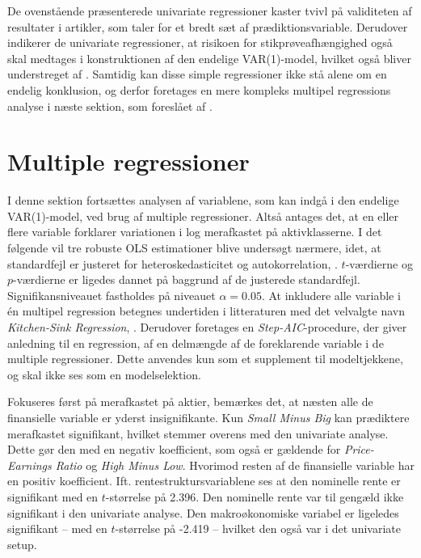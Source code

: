 \documentclass[
  a4paper,
  oneside]{memoir}
\begin{document}
De ovenstående præsenterede univariate regressioner kaster tvivl på validiteten af resultater i artikler, som taler for et bredt sæt af prædiktionsvariable. Derudover indikerer de univariate regressioner, at risikoen for stikprøveafhængighed også skal medtages i konstruktionen af den endelige VAR(1)-model, hvilket også bliver understreget af \citep{Goyal2007}. Samtidig kan disse simple regressioner ikke stå alene om en endelig konklusion, og derfor foretages en mere kompleks multipel regressions analyse i næste sektion, som foreslået af \citep{Goyal2007}.

\hypertarget{multreg}{%
\section{Multiple regressioner}\label{multreg}}

I denne sektion fortsættes analysen af variablene, som kan indgå i den endelige VAR(1)-model, ved brug af multiple regressioner. Altså antages det, at en eller flere variable forklarer variationen i log merafkastet på aktivklasserne. I det følgende vil tre robuste OLS estimationer blive undersøgt nærmere, idet, at standardfejl er justeret for heteroskedasticitet og autokorrelation, \citep{Newey1987}. \(t\)-værdierne og \(p\)-værdierne er ligedes dannet på baggrund af de justerede standardfejl. Signifikansniveauet fastholdes på niveauet \(\alpha=0.05\). At inkludere alle variable i én multipel regression betegnes undertiden i litteraturen med det velvalgte navn \emph{Kitchen-Sink Regression}, \citep{Goyal2007}. Derudover foretages en \emph{Step-AIC}-procedure, der giver anledning til en regression, af en delmængde af de foreklarende variable i de multiple regressioner. Dette anvendes kun som et supplement til modeltjekkene, og skal ikke ses som en modelselektion.

Fokuseres først på merafkastet på aktier, bemærkes det, at næsten alle de finansielle variable er yderst insignifikante. Kun \emph{Small Minus Big} kan prædiktere merafkastet signifikant, hvilket stemmer overens med den univariate analyse. Dette gør den med en negativ koefficient, som også er gældende for \emph{Price-Earnings Ratio} og \emph{High Minus Low}. Hvorimod resten af de finansielle variable har en positiv koefficient. Ift. rentestruktursvariablene ses at den nominelle rente er signifikant med en \(t\)-størrelse på 2.396. Den nominelle rente var til gengæld ikke signifikant i den univariate analyse. Den makroøkonomiske variabel er ligeledes signifikant -- med en \(t\)-størrelse på -2.419 -- hvilket den også var i det univariate setup.
\end{document}
